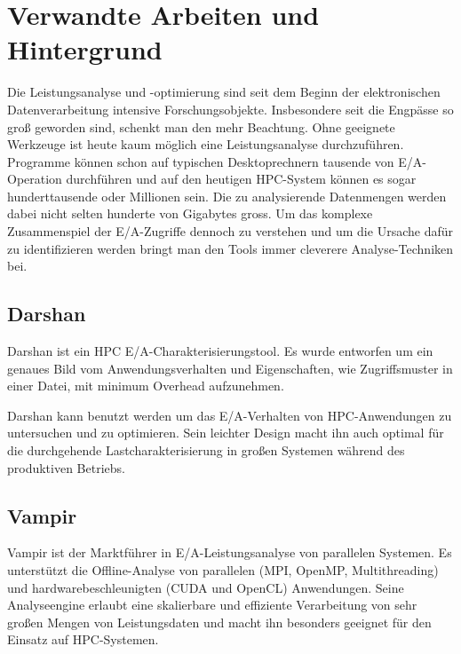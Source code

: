 

\newpage

\section{Verwandte Arbeiten und Hintergrund}
\textit{}

Die Leistungsanalyse und -optimierung sind seit dem Beginn der elektronischen Datenverarbeitung intensive Forschungsobjekte. 
Insbesondere seit die Engpässe so groß geworden sind, schenkt man den mehr Beachtung. 
Ohne geeignete Werkzeuge ist heute kaum möglich eine Leistungsanalyse durchzuführen. 
Programme können schon auf typischen Desktoprechnern tausende von E/A-Operation durchführen und auf den heutigen HPC-System können es sogar hunderttausende oder Millionen sein. 
Die zu analysierende Datenmengen werden dabei nicht selten hunderte von Gigabytes gross. 
Um das komplexe Zusammenspiel der E/A-Zugriffe dennoch zu verstehen und um die Ursache dafür zu identifizieren werden bringt man den Tools immer cleverere Analyse-Techniken bei.

\subsection{Darshan}
Darshan ist ein HPC E/A-Charakterisierungstool.
Es wurde entworfen um ein genaues Bild vom Anwendungsverhalten und Eigenschaften, wie Zugriffsmuster in einer Datei, mit minimum Overhead aufzunehmen.

Darshan kann benutzt werden um das E/A-Verhalten von HPC-Anwendungen zu untersuchen und zu optimieren. 
Sein leichter Design macht ihn auch optimal für die durchgehende Lastcharakterisierung in großen Systemen während des produktiven Betriebs.

\subsection{Vampir}
Vampir  ist der Marktführer in E/A-Leistungsanalyse von parallelen Systemen. 
Es unterstützt die Offline-Analyse von parallelen (MPI, OpenMP, Multithreading) und hardwarebeschleunigten (CUDA und OpenCL) Anwendungen. 
Seine Analyseengine erlaubt eine skalierbare und effiziente Verarbeitung von sehr großen Mengen von Leistungsdaten und macht ihn besonders geeignet für den Einsatz auf HPC-Systemen.

